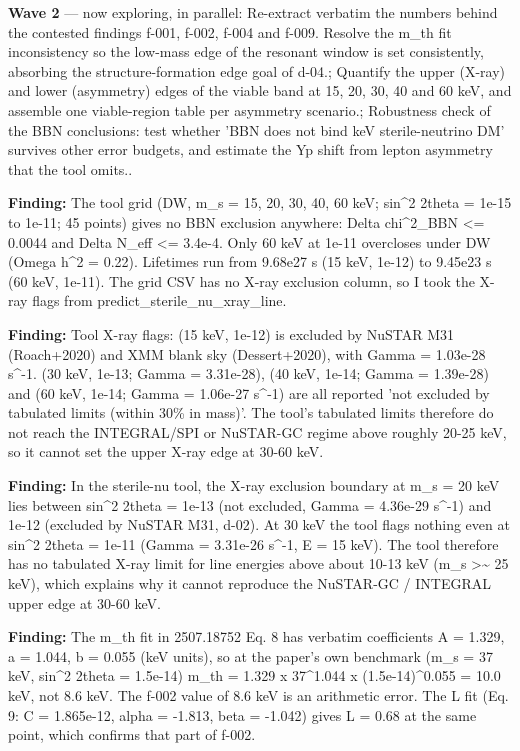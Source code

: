 \documentclass[11pt,a4paper]{article}
\begin{document}
\textbf{Wave 2} --- now exploring, in parallel: Re-extract verbatim the numbers behind the contested findings f-001, f-002, f-004 and f-009. Resolve the m\_th fit inconsistency so the low-mass edge of the resonant window is set consistently, absorbing the structure-formation edge goal of d-04.; Quantify the upper (X-ray) and lower (asymmetry) edges of the viable band at 15, 20, 30, 40 and 60 keV, and assemble one viable-region table per asymmetry scenario.; Robustness check of the BBN conclusions: test whether 'BBN does not bind keV sterile-neutrino DM' survives other error budgets, and estimate the Yp shift from lepton asymmetry that the tool omits..

\textbf{Finding:} The tool grid (DW, m\_s = 15, 20, 30, 40, 60 keV; sin\textasciicircum{}2 2theta = 1e-15 to 1e-11; 45 points) gives no BBN exclusion anywhere: \textbar{}Delta chi\textasciicircum{}2\_BBN\textbar{} \textless{}= 0.0044 and Delta N\_eff \textless{}= 3.4e-4. Only 60 keV at 1e-11 overcloses under DW (Omega h\textasciicircum{}2 = 0.22). Lifetimes run from 9.68e27 s (15 keV, 1e-12) to 9.45e23 s (60 keV, 1e-11). The grid CSV has no X-ray exclusion column, so I took the X-ray flags from predict\_sterile\_nu\_xray\_line.

\textbf{Finding:} Tool X-ray flags: (15 keV, 1e-12) is excluded by NuSTAR M31 (Roach+2020) and XMM blank sky (Dessert+2020), with Gamma = 1.03e-28 s\textasciicircum{}-1. (30 keV, 1e-13; Gamma = 3.31e-28), (40 keV, 1e-14; Gamma = 1.39e-28) and (60 keV, 1e-14; Gamma = 1.06e-27 s\textasciicircum{}-1) are all reported 'not excluded by tabulated limits (within 30\% in mass)'. The tool's tabulated limits therefore do not reach the INTEGRAL/SPI or NuSTAR-GC regime above roughly 20-25 keV, so it cannot set the upper X-ray edge at 30-60 keV.

\textbf{Finding:} In the sterile-nu tool, the X-ray exclusion boundary at m\_s = 20 keV lies between sin\textasciicircum{}2 2theta = 1e-13 (not excluded, Gamma = 4.36e-29 s\textasciicircum{}-1) and 1e-12 (excluded by NuSTAR M31, d-02). At 30 keV the tool flags nothing even at sin\textasciicircum{}2 2theta = 1e-11 (Gamma = 3.31e-26 s\textasciicircum{}-1, E = 15 keV). The tool therefore has no tabulated X-ray limit for line energies above about 10-13 keV (m\_s \textgreater{}\textasciitilde{} 25 keV), which explains why it cannot reproduce the NuSTAR-GC / INTEGRAL upper edge at 30-60 keV.

\textbf{Finding:} The m\_th fit in 2507.18752 Eq. 8 has verbatim coefficients A = 1.329, a = 1.044, b = 0.055 (keV units), so at the paper's own benchmark (m\_s = 37 keV, sin\textasciicircum{}2 2theta = 1.5e-14) m\_th = 1.329 x 37\textasciicircum{}1.044 x (1.5e-14)\textasciicircum{}0.055 = 10.0 keV, not 8.6 keV. The f-002 value of 8.6 keV is an arithmetic error. The L fit (Eq. 9: C = 1.865e-12, alpha = -1.813, beta = -1.042) gives L = 0.68 at the same point, which confirms that part of f-002.
\end{document}
